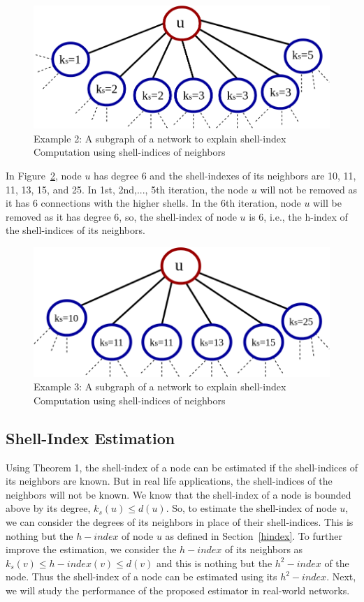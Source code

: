 \documentclass[12pt,3p]{article}
\begin{document}
\begin{figure}[htp]
  \centering
    \includegraphics[width=.55\linewidth]{images/kshell_example2.png}
  \caption{Example 2: A subgraph of a network to explain shell-index Computation using shell-indices of neighbors}
  \label{exa2}
\end{figure}

In Figure~\ref{exa3}, node $u$ has degree 6 and the shell-indexes of its neighbors are 10, 11, 11, 13, 15, and 25. In 1st, 2nd,..., 5th iteration, the node $u$ will not be removed as it has 6 connections with the higher shells. In the 6th iteration, node $u$ will be removed as it has degree 6, so, the shell-index of node $u$ is 6, i.e., the h-index of the shell-indices of its neighbors.

\begin{figure}[htp]
  \centering
    \includegraphics[width=.55\linewidth]{images/kshell_example3.png}
  \caption{Example 3: A subgraph of a network to explain shell-index Computation using shell-indices of neighbors}
  \label{exa3}
\end{figure}

\subsection*{Shell-Index Estimation}

Using Theorem 1, the shell-index of a node can be estimated if the shell-indices of its neighbors are known. But in real life applications, the shell-indices of the neighbors will not be known. We know that the shell-index of a node is bounded above by its degree, $k_s(u) \leq d(u)$. So, to estimate the shell-index of node $u$, we can consider the degrees of its neighbors in place of their shell-indices. This is nothing but the $h-index$ of node $u$ as defined in Section~\ref{hindex}. To further improve the estimation, we consider the $h-index$ of its neighbors as $k_s(v) \leq h-index(v) \leq d(v)$ and this is nothing but the $h^2-index$ of the node. Thus the shell-index of a node can be estimated using its $h^2-index$. Next, we will study the performance of the proposed estimator in real-world networks.
\end{document}
